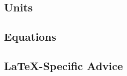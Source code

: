 \documentclass[conference]{IEEEtran}
\begin{document}
\subsection{Units}

\subsection{Equations}


\subsection{\LaTeX-Specific Advice}
\end{document}
